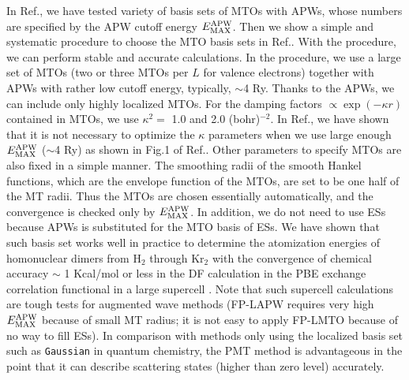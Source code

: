 \documentclass[twocolumn,showpacs,preprintnumbers,amsmath,amssymb,floatfix]{revtex4-1}
\def\EMAX{  E^{\rm APW}_{\rm MAX} }
\def\EMAX{  E^{\rm APW}_{\rm MAX} }
\def\EMAX{  E^{\rm APW}_{\rm MAX} }
\def\EMAX{  E^{\rm APW}_{\rm MAX} }
\def\EMAX{  E^{\rm APW}_{\rm MAX} }
\begin{document}
In Ref., we have tested variety
of basis sets of MTOs with APWs, whose numbers are specified by
the APW cutoff energy $\EMAX$. 
Then we show a simple and systematic procedure 
to choose the MTO basis sets in Ref..
With the procedure, we can perform 
stable and accurate calculations. 
In the procedure, we use a large set of MTOs 
(two or three MTOs per $L$ for valence electrons) together with APWs 
with rather low cutoff energy, typically, $\sim$4 Ry.
Thanks to the APWs, we can include only highly localized MTOs.
For the damping factors $\propto \exp(- \kappa r)$ contained in MTOs,
we use $\kappa^2=$ 1.0 and 2.0 (bohr)$^{-2}$. 
In Ref., we have shown that it is not necessary 
to optimize the $\kappa$ parameters when we use large enough $\EMAX$ ($\sim$4 Ry)
as shown in Fig.1 of Ref..
Other parameters to specify MTOs are also fixed in a simple manner.
The smoothing radii of the smooth Hankel functions, which
are the envelope function of the MTOs, are set to be one half of the MT radii.
Thus the MTOs are chosen essentially automatically, and
the convergence is checked only by $\EMAX$.
In addition, we do not need to use ESs because APWs is substituted for the MTO basis of ESs.
We have shown that such basis set works well in practice 
to determine the atomization 
energies of homonuclear dimers from H$_2$ through Kr$_2$ with the
convergence of chemical accuracy $\sim$ 1 Kcal/mol or less
in the DF calculation in the PBE exchange correlation functional in a large supercell
\cite{kotani_fusion_2010}. Note that such supercell calculations are 
tough tests for augmented wave methods (FP-LAPW requires very
high $\EMAX$ because of small MT radius; 
it is not easy to apply FP-LMTO because of no way to fill ESs).
In comparison with methods only using the localized basis set
such as \texttt{Gaussian} in quantum chemistry,
the PMT method is advantageous in the point that it can describe
scattering states (higher than zero level) accurately.

\end{document}
